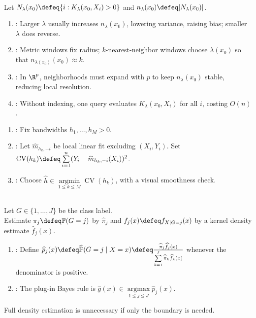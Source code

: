 \begin{remark} \label{rem:kernel-smoothing-practical-tradeoffs} \\
Let $N_\lambda(x_0)\defeq\{i:K_\lambda(x_0,X_i)>0\}$ and $n_\lambda(x_0)\defeq|N_\lambda(x_0)|$.
\begin{enumerate}[label=(\roman*)]
\setlength{\itemsep}{0pt}
\item {}: Larger $\lambda$ usually increases $n_\lambda(x_0)$, lowering variance, raising bias; smaller $\lambda$ does reverse.
\item {}: Metric windows fix radius; $k$-nearest-neighbor windows choose $\lambda(x_0)$ so that $n_{\lambda(x_0)}(x_0)\approx k$.
\item {}: In $\R^p$, neighborhoods must expand with $p$ to keep $n_\lambda(x_0)$ stable, reducing local resolution.
\item {}: Without indexing, one query evaluates $K_\lambda(x_0,X_i)$ for all $i$, costing $O(n)$.
\end{enumerate}
\end{remark}

\begin{method} \label{meth:local-linear-bandwidth-cross-validation} 
\begin{enumerate}[label=(\roman*)]
\setlength{\itemsep}{0pt}
\item {}: Fix bandwidths $h_1,\ldots,h_M>0$.
\item {}: Let $\widehat{m}_{h_k,-i}$ be local linear fit excluding $(X_i,Y_i)$. Set $\operatorname{CV}(h_k)\defeq\sum\limits_{i=1}^n(Y_i-\widehat{m}_{h_k,-i}(X_i))^2$.
\item {}: Choose $\widehat{h}\in\operatorname*{argmin}\limits_{1\leq k\leq M}\operatorname{CV}(h_k)$, with a visual smoothness check.
\end{enumerate}
\end{method}

\begin{definition} \label{def:kernel-density-classification} \\
Let $G\in\{1,\ldots,J\}$ be the class label.\\
Estimate $\pi_j\defeq\mathbb{P}(G=j)$ by $\widehat{\pi}_j$ and $f_j(x)\defeq f_{X\mid G=j}(x)$ by a kernel density estimate $\widehat{f}_j(x)$.
\begin{enumerate}[label=(\roman*)]
\setlength{\itemsep}{0pt}
\item {}: Define $\widehat{p}_j(x)\defeq\widehat{\mathbb{P}}(G=j\mid X=x)\defeq\frac{\widehat{\pi}_j\widehat{f}_j(x)}{\sum\limits_{k=1}^J\widehat{\pi}_k\widehat{f}_k(x)}$ whenever the denominator is positive.
\item {}: The plug-in Bayes rule is $\widehat{g}(x)\in\operatorname*{argmax}\limits_{1\leq j\leq J}\widehat{p}_j(x)$.
\end{enumerate}
Full density estimation is unnecessary if only the boundary is needed.
\end{definition}

